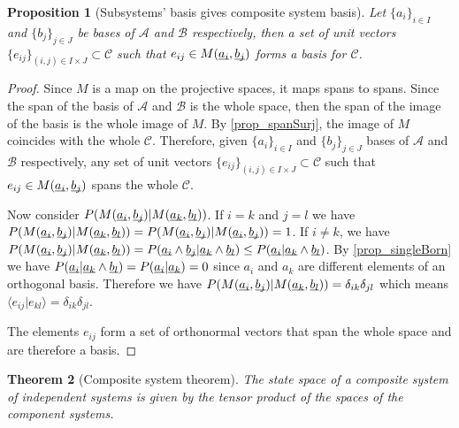 \documentclass[aps,prl,amsmath,amssymb,twocolumn,nofootinbib]{revtex4}
\theoremstyle{plain}
\newtheorem{thrm}{Theorem}[section]
\newtheorem{prop}[thrm]{Proposition}
\theoremstyle{definition}
\theoremstyle{remark}
\newcommand{\pj}[1] {\underbar{$#1$}}
\def\>{\rangle}
\def\<{\langle}
\begin{document}
	\begin{prop}[Subsystems' basis gives composite system
		basis]\label{prop_basis}
		Let $\{a_i\}_{i\in I}$ and $\{b_j\}_{j \in J}$ be bases of $\mathcal{A}$ and $\mathcal{B}$ respectively, then a set of unit vectors $\{e_{ij}\}_{(i,j) \in I \times J} \subset \mathcal{C}$  such that $e_{ij} \in M(\underbar{$a_i$}, \underbar{$b_j$})$ forms a basis for $\mathcal{C}$.
	\end{prop}
	
	\begin{proof}
		
		Since $M$ is a map on the projective spaces, it maps spans to spans.
		Since the span of the basis of $\mathcal{A}$ and $\mathcal{B}$ is
		the whole space, then the span of the image of the basis is the
		whole image of $M$. By \ref{prop_spanSurj}, the image of $M$
		coincides with the whole $\mathcal{C}$. Therefore, given
		$\{a_i\}_{i\in I}$ and $\{b_j\}_{j \in J}$ bases of $\mathcal{A}$
		and $\mathcal{B}$ respectively, any set of unit vectors
		$\{e_{ij}\}_{(i,j) \in I \times J} \subset \mathcal{C}$ such that
		$e_{ij} \in M(\pj{a_i}, \pj{b_j})$ spans the whole $\mathcal{C}$.
		
		Now consider $P(M(\pj{a_i},\pj{b_j})|M(\pj{a_k},\pj{b_l}))$. If $i=k$ and $j=l$ we have $P(M(\pj{a_i},\pj{b_j})|M(\pj{a_k},\pj{b_l}))= P(M(\pj{a_i},\pj{b_j})|M(\pj{a_i},\pj{b_j})) = 1$. If $i\neq k$, we have $P(M(\pj{a_i},\pj{b_j})|M(\pj{a_k},\pj{b_l})) = P(\pj{a_i} \wedge \pj{b_j} | \pj{a_k} \wedge \pj{b_l}) \leq P(\pj{a_i} | \pj{a_k} \wedge \pj{b_l})$. By \ref{prop_singleBorn} we have $P(\pj{a_i} | \pj{a_k} \wedge \pj{b_l}) = P(\pj{a_i} | \pj{a_k}) = 0$ since $a_i$ and $a_k$ are different elements of an orthogonal basis. Therefore we have $P(M(\pj{a_i},\pj{b_j})|M(\pj{a_k},\pj{b_l}))=\delta_{ik}\delta_{jl}$ which means $\<e_{ij} | e_{kl} \> = \delta_{ik}\delta_{jl}$.
		
		The elements $e_{ij}$ form a set of orthonormal vectors that span the whole space and are therefore a basis.
	\end{proof}
	
	\begin{thrm}[Composite system theorem]\label{theo}
		The state space of a composite system of independent systems is given by the tensor product of the spaces of the component systems.
	\end{thrm}
	
\end{document}
